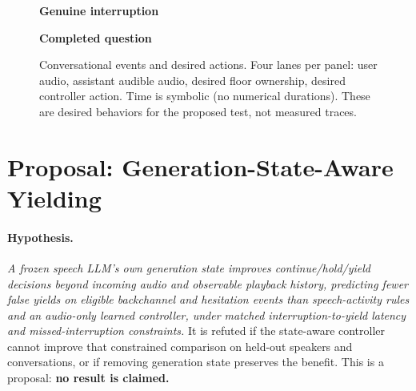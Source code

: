 \documentclass[11pt,a4paper,twocolumn]{article}
\begin{document}
\begin{figure}[!tbp]
\vspace{0.6em}
\begin{minipage}{0.48\textwidth}
\centering
\footnotesize\textbf{Genuine interruption}\\[2pt]
\end{minipage}
\hfill
\begin{minipage}{0.48\textwidth}
\centering
\footnotesize\textbf{Completed question}\\[2pt]
\end{minipage}
\caption{Conversational events and desired actions. Four lanes per panel: user audio, assistant audible audio, desired floor ownership, desired controller action. Time is symbolic (no numerical durations). These are desired behaviors for the proposed test, not measured traces.}
\label{fig:events}
\end{figure}

\section{Proposal: Generation-State-Aware Yielding}
\label{sec:proposal}

\paragraph{Hypothesis.} \emph{A frozen speech LLM's own generation state improves continue/hold/yield decisions beyond incoming audio and observable playback history, predicting fewer false yields on eligible backchannel and hesitation events than speech-activity rules and an audio-only learned controller, under matched interruption-to-yield latency and missed-interruption constraints.} It is refuted if the state-aware controller cannot improve that constrained comparison on held-out speakers and conversations, or if removing generation state preserves the benefit. This is a proposal: \textbf{no result is claimed.}
\end{document}
